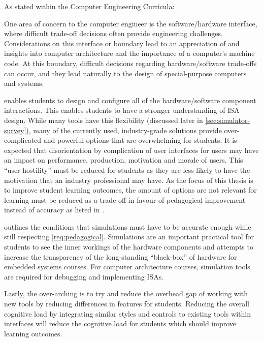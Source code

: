 As stated within the Computer Engineering Curricula:
\begin{displayquote}
    One area of concern to the computer engineer is the software/hardware interface, where difficult trade-off decisions often provide engineering challenges. Considerations on this interface or boundary lead to an    appreciation of and insights into computer architecture and the importance of a computer’s machine code. At this boundary, difficult decisions regarding hardware/software trade-offs can occur, and they lead naturally to the design of special-purpose computers and systems.
\end{displayquote}
 enables students to design and configure all of the hardware/software component interactions. This enables students to have a stronger understanding of ISA design. While many tools have this flexibility (discussed later in \cref{sec:simulator-survey}), many of the currently used, industry-grade solutions provide over-complicated and powerful options that are overwhelming for students. It is expected that disorientation by complication of user interfaces for users may have an impact on performance, production, motivation and morale of users\cite{Chalmers2003}. This ``user hostility'' must be reduced for students as they are less likely to have the motivation that an industry professional may have\cite{Djordjevic2005}. As the focus of this thesis is to improve student learning outcomes, the amount of options are not relevant for learning must be reduced as a trade-off in favour of pedagogical improvement instead of accuracy as listed in . 

 outlines the conditions that simulations must have to be accurate enough while still respecting \cref{req:pedagogical}. Simulations are an important practical tool for students to see the inner workings of the hardware components and attempts to increase the transparency of the long-standing ``black-box'' of hardware for embedded systems courses. For computer architecture courses, simulation tools are required for debugging and implementing ISAs. 

Lastly, the over-arching  is to try and reduce the overhead gap of working with new tools by reducing differences in features for students. Reducing the overall cognitive load by integrating similar styles and controls to existing tools within interfaces will reduce the cognitive load for students which should improve learning outcomes\cite{Chalmers2003, Mavaddat1988}.


